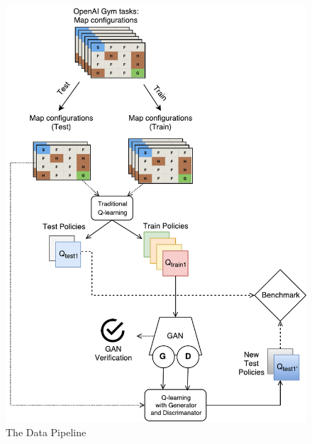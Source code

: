 \begin{figure}[H]
\centering
\includegraphics[width=13cm]{Figures/Pipeline}
\caption{The Data Pipeline}
\label{fig:pipeline}
\end{figure}


